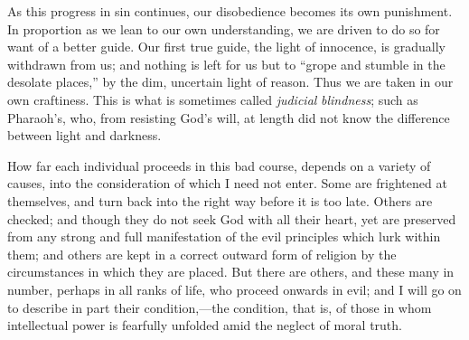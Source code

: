 As this progress in sin continues, our disobedience
becomes its own punishment. In proportion as we lean to
our own understanding, we are driven to do so for want of
a better guide. Our first true guide, the light of
innocence, is gradually withdrawn from us; and nothing is
left for us but to ``grope and stumble in the
desolate places,'' by the dim, uncertain light of
reason. Thus we are taken in our own craftiness. This is
what is sometimes called \emph{judicial} \emph{blindness};
such as Pharaoh's, who, from resisting God's will, at
length did not know the difference between light and
darkness.

How far each individual proceeds in this bad course,
depends on a variety of causes, into the consideration of
which I need not enter. Some are frightened at
themselves, and turn back into the right way before it is
too late. Others are checked; and though they do not seek
God with all their heart, yet are preserved from any
strong and full manifestation of the evil principles
which lurk within them; and others are kept in a correct
outward form of religion by the circumstances in which
they are placed. But there are others, and these many in
number, perhaps in all ranks of life, who proceed onwards
in evil; and I will go on to describe in part their
condition,—the condition, that is, of those in whom
intellectual power is fearfully unfolded amid the neglect
of moral truth.

